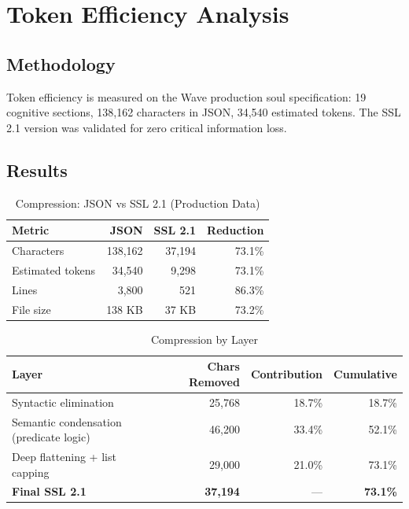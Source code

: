 \documentclass[12pt,a4paper]{article}
\theoremstyle{plain}
\theoremstyle{definition}
\theoremstyle{remark}
\begin{document}
\section{Token Efficiency Analysis}

\subsection{Methodology}

Token efficiency is measured on the Wave production soul specification: 19 cognitive sections, 138,162 characters in JSON, 34,540 estimated tokens. The SSL 2.1 version was validated for zero critical information loss.

\subsection{Results}

\begin{table}[H]
\centering
\caption{Compression: JSON vs SSL 2.1 (Production Data)}
\label{tab:comparison}
\begin{tabular}{@{}lrrr@{}}
\toprule
\textbf{Metric} & \textbf{JSON} & \textbf{SSL 2.1} & \textbf{Reduction} \\
\midrule
Characters & 138,162 & 37,194 & 73.1\% \\
Estimated tokens & 34,540 & 9,298 & 73.1\% \\
Lines & 3,800 & 521 & 86.3\% \\
File size & 138 KB & 37 KB & 73.2\% \\
\bottomrule
\end{tabular}
\end{table}

\begin{table}[H]
\centering
\caption{Compression by Layer}
\label{tab:layers}
\begin{tabular}{@{}lrrr@{}}
\toprule
\textbf{Layer} & \textbf{Chars Removed} & \textbf{Contribution} & \textbf{Cumulative} \\
\midrule
Syntactic elimination & 25,768 & 18.7\% & 18.7\% \\
Semantic condensation (predicate logic) & 46,200 & 33.4\% & 52.1\% \\
Deep flattening + list capping & 29,000 & 21.0\% & 73.1\% \\
\midrule
\textbf{Final SSL 2.1} & \textbf{37,194} & --- & \textbf{73.1\%} \\
\bottomrule
\end{tabular}
\end{table}
\end{document}
